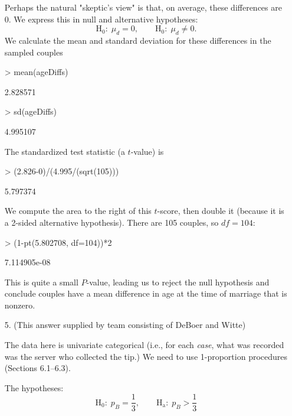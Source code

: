 \documentclass{article}
\begin{document}
\begin{enumerate}
Perhaps the natural "skeptic's view" is that, on average,
these differences are 0.  We express this in null and
alternative hypotheses:
$$ \mathrm{H_0}\colon \;\mu_d = 0, \qquad
  \mathrm{H_0}\colon \;\mu_d \ne 0. $$
We calculate the mean and standard deviation for these
differences in the sampled couples
\begin{Schunk}
\begin{Sinput}
> mean(ageDiffs)
\end{Sinput}
\begin{Soutput}
[1] 2.828571
\end{Soutput}
\begin{Sinput}
> sd(ageDiffs)
\end{Sinput}
\begin{Soutput}
[1] 4.995107
\end{Soutput}
\end{Schunk}
The standardized test statistic (a $t$-value) is
\begin{Schunk}
\begin{Sinput}
> (2.826-0)/(4.995/(sqrt(105)))
\end{Sinput}
\begin{Soutput}
[1] 5.797374
\end{Soutput}
\end{Schunk}
We compute the area to the right of this $t$-score, then
double it (because it is a 2-sided alternative hypothesis).
There are 105 couples, so $df = 104$:
\begin{Schunk}
\begin{Sinput}
> (1-pt(5.802708, df=104))*2
\end{Sinput}
\begin{Soutput}
[1] 7.114905e-08
\end{Soutput}
\end{Schunk}
This is quite a small $P$-value, leading us to reject
the null hypothesis and conclude couples have a mean difference
in age at the time of marriage that is nonzero.

\item[5.]
(This answer supplied by team consisting of DeBoer and Witte)

The data here is univariate categorical (i.e., for each
\textit{case}, what was recorded was the server who collected
the tip.)  We need to use 1-proportion procedures (Sections
6.1--6.3).

The hypotheses:
$$ \mathrm{H_0}\colon \; p_B = \frac{1}{3}, \qquad
  \mathrm{H_a}\colon \; p_B > \frac{1}{3} $$


\end{enumerate}
\end{document}
